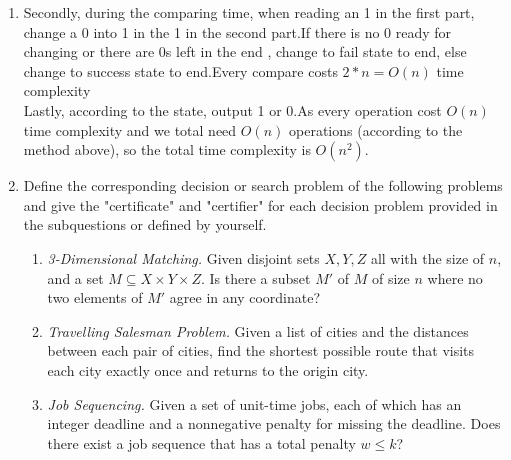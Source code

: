 \documentclass[12pt,a4paper]{article}
\makeatletter
\newtheorem*{solution}{Solution}
\theoremstyle{definition}
\renewenvironment{solution}[1][Solution] {\par\pushQED{\qed}\normalfont\topsep6\p@\@plus6\p@\relax\trivlist\item[\hskip\labelsep\bfseries#1\@addpunct{.}]\ignorespaces}{\popQED\endtrivlist\@endpefalse} \makeatother
\makeatother
\begin{document}
\begin{enumerate}
\begin{solution}
\begin{enumerate}
\begin{enumerate}
        Secondly, during the comparing time, when reading an 1 in the first part, change a 0 into 1 in the 1 in the second part.If there is no 0 ready for changing or there are 0s left in the end , change to fail state to end, else change to success state to end.Every compare costs $2*n=O(n)$ time complexity\\
        Lastly, according to the state, output 1 or 0.As every operation cost $O(n)$ time complexity and we total need $O(n)$ operations (according to the method above), so the total time complexity is $O(n^2)$.
        \end{enumerate}
        \end{enumerate}
    \end{solution}
	\item Define the corresponding decision or search problem of the following problems and give the "certificate" and "certifier" for each decision problem provided in the subquestions or defined by yourself.
	
	\begin{enumerate}
	    \item
	    \textit{3-Dimensional Matching.}  Given disjoint sets $X,Y,Z$ all with the size of $n$, and a set $M \subseteq X\times Y\times Z$.  Is there a subset $M'$ of $M$ of size $n$ where no two elements of $M'$ agree in any coordinate?
	    
	    \item 
	    \textit{Travelling Salesman Problem.} Given a list of cities and the distances between each pair of cities, find the shortest possible route that visits each city exactly once and returns to the origin city.
	    
	    \item
	    \textit{Job Sequencing.} Given a set of unit-time jobs, each of which has an integer deadline and a nonnegative penalty for missing the deadline. Does there exist a job sequence that has a total penalty $w\leqslant k$?
	    

\end{enumerate}
\end{enumerate}
\end{document}
